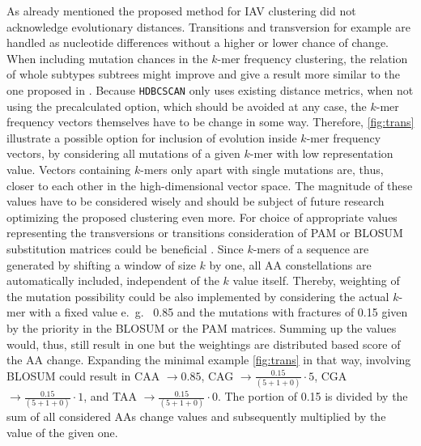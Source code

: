 As already mentioned the proposed method for \gls{IAV} clustering did not acknowledge evolutionary distances. Transitions and transversion for example are handled as nucleotide differences without a higher or lower chance of change. When including mutation chances in the $k$-mer frequency clustering, the relation of whole subtypes subtrees might improve and give a result more similar to the one proposed in \textcite{wei_next-generation_2020}. Because \texttt{HDBCSCAN} only uses existing distance metrics, when not using the precalculated option, which should be avoided at any case, the $k$-mer frequency vectors themselves have to be change in some way. Therefore, \autoref{fig:trans} illustrate a possible option for inclusion of evolution inside $k$-mer frequency vectors, by considering all mutations of a given $k$-mer with low representation value. Vectors containing $k$-mers only apart with single mutations are, thus, closer to each other in the high-dimensional vector space. The magnitude of these values have to be considered wisely and should be subject of future research optimizing the proposed clustering even more. For choice of appropriate values representing the transversions or transitions consideration of PAM or BLOSUM substitution matrices could be beneficial \autocite{mount_comparison_2008}. Since $k$-mers of a sequence are generated by shifting a window of size $k$ by one, all \gls{AA} constellations are automatically included, independent of the $k$ value itself. Thereby, weighting of the mutation possibility could be also implemented by considering the actual $k$-mer with a fixed value e.~g.~ 0.85 and the mutations with fractures of 0.15 given by the priority in the BLOSUM or the PAM matrices. Summing up the values would, thus, still result in one but the weightings are distributed based score of the \gls{AA} change. Expanding the minimal example \autoref{fig:trans} in that way, involving BLOSUM could result in CAA $\rightarrow 0.85$, CAG $\rightarrow \frac{0.15}{(5+1+0)}\cdot 5$, CGA $\rightarrow \frac{0.15}{(5+1+0)}\cdot 1$, and TAA $\rightarrow \frac{0.15}{(5+1+0)}\cdot 0$. The portion of 0.15 is divided by the sum of all considered \glspl{AA} change values and subsequently multiplied by the value of the given one.